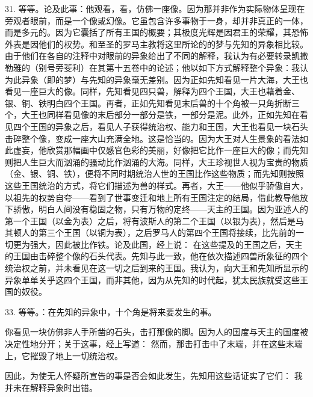 31. 等等。论及此事：他观看，看，仿佛一座像。因为那并非作为实际物体呈现在旁观者眼前，而是一个像或幻像。它虽包含许多事物于一身，却并非真正的一体，而是多元的。因为它囊括了所有王国的概要；其极度光辉是因君王的荣耀，其恐怖外表是因他们的权势。和至圣的罗马主教将这里所论的的梦与先知的异象相比较。由于他们在各自的注释中对眼前的异象给出了不同的解释，我认为有必要转录凯撒勒雅的（别号旁斐利）在其第十五卷中的论述；他以如下方式解释整个异象：我认为此异象（即的梦）与先知的异象毫无差别。因为正如先知看见一片大海，大王也看见一座巨大的像。同样，先知看见四只兽，解释为四个王国，大王也藉着金、银、铜、铁明白四个王国。再者，正如先知看见末后兽的十个角被一只角折断三个，大王也同样看见像的末后部分一部分是铁，一部分是泥。此外，正如先知在看见四个王国的异象之后，看见人子获得统治权、能力和王国，大王也看见一块石头击碎整个像，变成一座大山充满全地。这是恰当的。因为大王对人生景象的看法如此虚妄，他欣赏那幅画中仅感官色彩的美丽，好像把它比作一座巨大的像；而先知则把人生巨大而汹涌的骚动比作汹涌的大海。同样，大王珍视世人视为宝贵的物质（金、银、铜、铁），便将不同时期统治人世的王国比作这些物质；而先知则按照这些王国统治的方式，将它们描述为兽的样式。再者，大王——他似乎骄傲自大，以祖先的权势自夸——看到了世事变迁和地上所有王国注定的结局，借此教导他放下骄傲，明白人间没有稳固之物，只有万物的定终——天主的王国。因为亚述人的第一个王国（以金为表）之后，将有波斯人的第二个王国（以银为表），然后是马其顿人的第三个王国（以铜为表），之后罗马人的第四个王国将接续，比先前的一切更为强大，因此被比作铁。论及此国，经上说： 在这些提及的王国之后，天主的王国由击碎整个像的石头代表。先知与此一致，他在依次描述四兽所象征的四个统治权之前，并未看见在这一切之后到来的王国。我认为，向大王和先知所显示的异象单单关乎这四个王国，而非其他，因为从先知的时代起，犹太民族就受这些王国的奴役。\par

33. 等等。：在先知的异象中，十个角是将来要发生的事。\par

 你看见一块仿佛非人手所凿的石头，击打那像的脚。因为人的国度与天主的国度被决定性地分开；关于这事，经上写道： 然而，那击打击中了末端，并在这些末端上，它摧毁了地上一切统治权。\par

 因此，为使无人怀疑所宣告的事是否会如此发生，先知用这些话证实了它们： 我并未在解释异象时出错。\par


